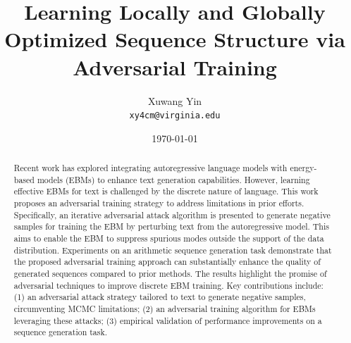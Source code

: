 \documentclass{article}
\title{Learning Locally and Globally Optimized Sequence Structure via Adversarial Training}
\author{Xuwang Yin \\{\texttt{xy4cm@virginia.edu}}}
\date{\today}
\begin{document}
\maketitle

\begin{abstract}

  Recent work has explored integrating autoregressive language models with energy-based models (EBMs) to enhance text generation capabilities. However, learning effective EBMs for text is challenged by the discrete nature of language. This work proposes an adversarial training strategy to address limitations in prior efforts. Specifically, an iterative adversarial attack algorithm is presented to generate negative samples for training the EBM by perturbing text from the autoregressive model. This aims to enable the EBM to suppress spurious modes outside the support of the data distribution. Experiments on an arithmetic sequence generation task demonstrate that the proposed adversarial training approach can substantially enhance the quality of generated sequences compared to prior methods. The results highlight the promise of adversarial techniques to improve discrete EBM training. Key contributions include: (1) an adversarial attack strategy tailored to text to generate negative samples, circumventing MCMC limitations; (2) an adversarial training algorithm for EBMs leveraging these attacks; (3) empirical validation of performance improvements on a sequence generation task.

\end{abstract}


\end{document}
